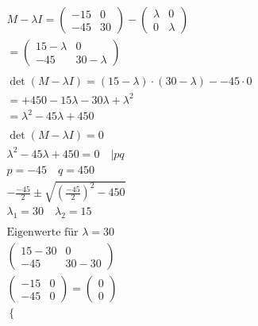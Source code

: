 \begin{align*}
    M - \lambda I = \begin{pmatrix}
                        -    15 & 0 \\ -45 & 30
                    \end{pmatrix} - \begin{pmatrix}
                                        \lambda & 0       \\
                                        0       & \lambda
                                    \end{pmatrix}                                   \\
    = \begin{pmatrix}
          15 - \lambda & 0            \\
          -45           & 30 - \lambda
      \end{pmatrix}                                                      \\\\
    \det\left(M - \lambda I\right) = (15 - \lambda) \cdot (30 - \lambda) - -45 \cdot 0 \\
    = +450 - 15\lambda - 30\lambda +\lambda^2 \\
    = \lambda^2 - 45\lambda + 450 \\\\
    \det(M - \lambda I) = 0 \\
    \lambda^2 - 45\lambda + 450 = 0 \quad | pq \\
    p = -45 \quad q = 450 \\
    -\frac{-45}{2} \pm \sqrt{{\left(\frac{-45}{2}\right)}^2 - 450} \\
    \lambda_1 = 30 \quad \lambda_2 = 15 \\\\
    \text{Eigenwerte für }\lambda = 30 \\
    \begin{pmatrix}
        15 - 30 & 0 \\
        -45 & 30 - 30
    \end{pmatrix}\\
    \begin{pmatrix}
        -15 & 0 \\
        -45 & 0
    \end{pmatrix} = \begin{pmatrix}
        0 \\ 0
    \end{pmatrix} \\
    \begin{cases}

\end{cases}
\end{align*}
